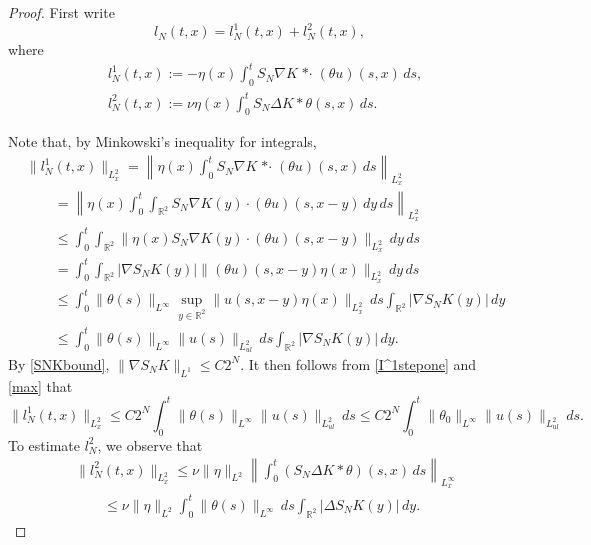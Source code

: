 \documentclass[11pt,reqno,xcolor=svgnames]{amsart}
\def\R{{\mathbb R}}
\theoremstyle{plain}
\theoremstyle{definition}
\theoremstyle{plain}
\theoremstyle{remark}
\newcommand{\abs}[1]{\left\vert#1\right\vert}
\newcommand{\stardot}{{\mathop{* \cdot}}}
\begin{document}
\begin{proof}
First write $$l_N(t,x) =l_N^1(t,x) +l_N^2(t,x),$$ where 
\begin{equation*}
\begin{split}
&l_N^1(t,x) := -\eta(x)\int_0^t S_{N}\nabla K \stardot (\theta u) (s,x) \, ds,\\
&l_N^2(t,x) :=  \nu\eta(x)\int_0^t S_{N}\Delta K \ast \theta(s,x) \, ds. 
\end{split}
\end{equation*}  

Note that, by Minkowski's inequality for integrals,
\begin{equation}\label{I^1stepone}
\begin{split}
&\|l_N^1(t, x) \|_{L^2_x} = \left \| \eta(x)\int_0^t S_{N}\nabla K \stardot (\theta u)(s,x)  \, ds \right \|_{L^2_x}\\
&\qquad = \left \| \eta(x)\int_0^t \int_{\R^2}S_{N}\nabla K(y) \cdot(\theta u)(s,x-y) \, dy  \, ds \right \|_{L^2_x}\\
&\qquad \leq  \int_0^t\int_{\R^2} \| \eta(x) S_{N}\nabla K(y) \cdot(\theta u)(s,x-y) \|_{L^2_x} \, dy  \, ds \\
&\qquad = \int_0^t\int_{\R^2} \abs{\nabla S_{N}K(y)} \| (\theta u)(s, x-y)\eta(x) \|_{L^2_x} \, dy\, ds\\
&\qquad \leq \int_0^t\| \theta(s)\|_{L^{\infty}} \sup_{y\in\R^2}\| u(s, x-y)\eta(x) \|_{L^2_x}\, ds \int_{\R^2} \abs{\nabla S_{N}K(y)}  \, dy\\
&\qquad \leq \int_0^t\| \theta(s)\|_{L^{\infty}} \| u(s) \|_{L^2_{ul}}\, ds \int_{\R^2} \abs{\nabla S_{N}K(y)}  \, dy.
\end{split}
\end{equation}
By \cref{SNKbound}, $\| \nabla S_{N}K \|_{L^1} \leq C2^{N}$.  It then follows from \cref{I^1stepone} and \cref{max} that \begin{equation}\label{lowfreqjust}\|l_N^1(t,x) \|_{L^2_x} \leq C2^{N}\int_0^t\| \theta(s)\|_{L^{\infty}} \| u(s) \|_{L^2_{ul}}\, ds \leq C2^{N}\int_0^t\| \theta_0\|_{L^{\infty}} \| u(s) \|_{L^2_{ul}}\, ds.
\end{equation}
To estimate $l_N^2$, we observe that 
\begin{equation}\label{ln:l1-l2-bound}
\begin{split}
&\|l_N^2(t, x) \|_{L^2_x} \leq \nu\| \eta\|_{L^2} \left \|\int_0^t (S_{N}\Delta K \ast \theta)(s,x)  \, ds \right \|_{L^{\infty}_x}\\
&\qquad \leq \nu\| \eta\|_{L^2}\int_0^t\| \theta(s) \|_{L^{\infty}}\, ds \int_{\R^2} \abs{\Delta S_{N}K(y)}  \, dy.

\end{split}
\end{equation}
\end{proof}
\end{document}
